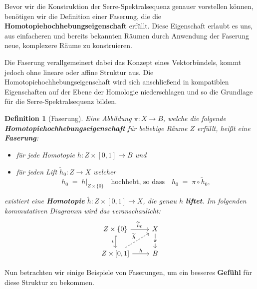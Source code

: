 \documentclass[12pt]{article}
\numberwithin{conj}{section}
\newtheorem{definition}[conj]{Definition}
\begin{document}
    Bevor wir die Konstruktion der Serre-Spektralsequenz genauer vorstellen können,
    benötigen wir die Definition einer Faserung, die die \textbf{Homotopiehochhebungseigenschaft}
    erfüllt. Diese Eigenschaft erlaubt es uns, aus einfacheren und bereits
    bekannten Räumen durch Anwendung der Faserung neue, komplexere Räume zu konstruieren.

    Die Faserung verallgemeinert dabei das Konzept eines Vektorbündels, kommt
    jedoch ohne lineare oder affine Struktur aus. Die Homotopiehochhebungseigenschaft
    wird sich anschließend in kompatiblen Eigenschaften auf der Ebene der Homologie
    niederschlagen und so die Grundlage für die Serre-Spektralsequenz bilden.

    \begin{definition}[Faserung]
        Eine Abbildung $\pi : X \to B$, welche die folgende \textbf{Homotopiehochhebungseigenschaft}
        für beliebige Räume $Z$ erfüllt, heißt eine \textbf{Faserung}:
        \begin{itemize}[noitemsep]
            \item für jede Homotopie $h : Z \times [0,1] \to B$ und

            \item für jeden Lift $\widetilde{h}_{0} : Z \to X$ welcher
                \[
                    h_{0} \;=\; h\vert_{Z\times \{0\}}\quad\text{hochhebt, so dass}\quad h_{0} \;=\; \pi
                    \circ \widetilde{h}_{0},
                \]
        \end{itemize}
        existiert eine \textbf{Homotopie} $\widetilde{h}: Z \times [0,1] \to X$, die
        genau $h$ \textbf{liftet}. Im folgenden kommutativen Diagramm wird das
        veranschaulicht:
        \[
            \begin{tikzcd}
                {Z\times\{0\}} & X \\ {Z\times[0,1]} & B \arrow["{\widetilde{h}_0}",
                from=1-1, to=1-2] \arrow["\iota"', hook, from=1-1, to=2-1] \arrow["\pi"{description},
                from=1-2, to=2-2] \arrow["{\widetilde{h}}", dashed, from=2-1, to=1-2] \arrow["h",
                from=2-1, to=2-2]
            \end{tikzcd}
        \]
    \end{definition}

    \noindent
    Nun betrachten wir einige Beispiele von Faserungen, um ein besseres \textbf{Gefühl}
    für diese Struktur zu bekommen.
\end{document}
